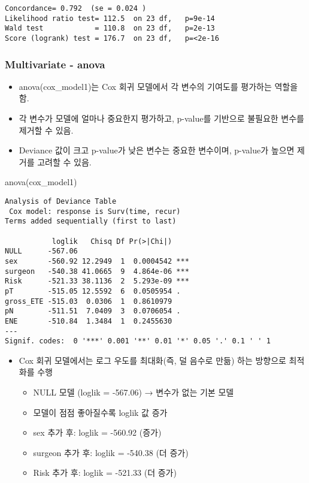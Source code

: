 \documentclass[
  letterpaper,
  DIV=11,
  numbers=noendperiod]{scrartcl}
\newenvironment{Shaded}{\begin{snugshade}}{\end{snugshade}}
\newcommand{\FunctionTok}[1]{\textcolor[rgb]{0.28,0.35,0.67}{#1}}
\newcommand{\NormalTok}[1]{\textcolor[rgb]{0.00,0.23,0.31}{#1}}
\providecommand{\tightlist}{%
  \setlength{\itemsep}{0pt}\setlength{\parskip}{0pt}}\usepackage{longtable,booktabs,array}
\begin{document}
\begin{verbatim}
Concordance= 0.792  (se = 0.024 )
Likelihood ratio test= 112.5  on 23 df,   p=9e-14
Wald test            = 110.8  on 23 df,   p=2e-13
Score (logrank) test = 176.7  on 23 df,   p=<2e-16
\end{verbatim}

\subsubsection{Multivariate - anova}\label{multivariate---anova}

\begin{itemize}
\tightlist
\item
  anova(cox\_model1)는 Cox 회귀 모델에서 각 변수의 기여도를 평가하는
  역할을 함.
\item
  각 변수가 모델에 얼마나 중요한지 평가하고, p-value를 기반으로 불필요한
  변수를 제거할 수 있음.
\item
  Deviance 값이 크고 p-value가 낮은 변수는 중요한 변수이며, p-value가
  높으면 제거를 고려할 수 있음.
\end{itemize}

\begin{Shaded}
\begin{Highlighting}[]
\FunctionTok{anova}\NormalTok{(cox\_model1)}
\end{Highlighting}
\end{Shaded}

\begin{verbatim}
Analysis of Deviance Table
 Cox model: response is Surv(time, recur)
Terms added sequentially (first to last)

           loglik   Chisq Df Pr(>|Chi|)    
NULL      -567.06                          
sex       -560.92 12.2949  1  0.0004542 ***
surgeon   -540.38 41.0665  9  4.864e-06 ***
Risk      -521.33 38.1136  2  5.293e-09 ***
pT        -515.05 12.5592  6  0.0505954 .  
gross_ETE -515.03  0.0306  1  0.8610979    
pN        -511.51  7.0409  3  0.0706054 .  
ENE       -510.84  1.3484  1  0.2455630    
---
Signif. codes:  0 '***' 0.001 '**' 0.01 '*' 0.05 '.' 0.1 ' ' 1
\end{verbatim}

\begin{itemize}
\tightlist
\item
  Cox 회귀 모델에서는 로그 우도를 최대화(즉, 덜 음수로 만듦) 하는
  방향으로 최적화를 수행

  \begin{itemize}
  \tightlist
  \item
    NULL 모델 (loglik = -567.06) → 변수가 없는 기본 모델
  \item
    모델이 점점 좋아질수록 loglik 값 증가
  \item
    sex 추가 후: loglik = -560.92 (증가)
  \item
    surgeon 추가 후: loglik = -540.38 (더 증가)
  \item
    Risk 추가 후: loglik = -521.33 (더 증가)
  \end{itemize}
\end{itemize}
\end{document}
